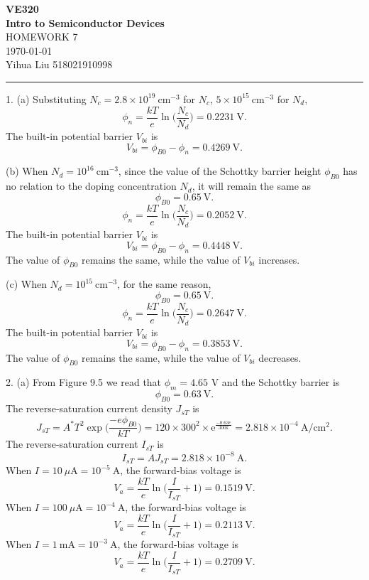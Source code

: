 \documentclass[a4paper]{article}
\begin{document}
\begin{center}
\huge
\textbf{VE320\\Intro to Semiconductor Devices\\}
\Large
\vspace{30pt}
\uppercase{Homework 7}\\
\vspace{5pt}\today\\
\vspace{5pt}
Yihua Liu 518021910998
\vspace{5pt}
\rule[-10pt]{.97\linewidth}{0.05em}
\end{center}
1. (a) Substituting $N_c=2.8\times10^{19}\ \mathrm{cm^{-3}}$ for $N_c$, $5\times10^{15}\ \mathrm{cm^{-3}}$ for $N_d$,
$$\phi_n=\frac{kT}{e}\ln{\bigg(\frac{N_c}{N_d}\bigg)}=0.2231\ \mathrm{V}.$$
The built-in potential barrier $V_{bi}$ is
$$V_{bi}=\phi_{B0}-\phi_n=0.4269\ \mathrm{V}.$$

(b) When $N_d=10^{16}\ \mathrm{cm^{-3}}$, since the value of the Schottky barrier height $\phi_{B0}$ has no relation to the doping concentration $N_d$, it will remain the same as
$$\phi_{B0}=0.65\ \mathrm{V}.$$
$$\phi_n=\frac{kT}{e}\ln{\bigg(\frac{N_c}{N_d}\bigg)}=0.2052\ \mathrm{V}.$$
The built-in potential barrier $V_{bi}$ is
$$V_{bi}=\phi_{B0}-\phi_n=0.4448\ \mathrm{V}.$$
The value of $\phi_{B0}$ remains the same, while the value of $V_{bi}$ increases.

(c) When $N_d=10^{15}\ \mathrm{cm^{-3}}$, for the same reason,
$$\phi_{B0}=0.65\ \mathrm{V}.$$
$$\phi_n=\frac{kT}{e}\ln{\bigg(\frac{N_c}{N_d}\bigg)}=0.2647\ \mathrm{V}.$$
The built-in potential barrier $V_{bi}$ is
$$V_{bi}=\phi_{B0}-\phi_n=0.3853\ \mathrm{V}.$$
The value of $\phi_{B0}$ remains the same, while the value of $V_{bi}$ decreases.

2. (a) From Figure 9.5 we read that $\phi_m=4.65$ V and the Schottky barrier is
$$\phi_{B0}=0.63\ \mathrm{V}.$$
The reverse-saturation current density $J_{sT}$ is
$$J_{sT}=A^*T^2\exp{\bigg(\frac{-e\phi_{B0}}{kT}\bigg)}=120\times300^2\times\mathrm{e}^{\frac{-0.63e}{300k}}=2.818\times10^{-4}\ \mathrm{A/cm^2}.$$
The reverse-saturation current $I_{sT}$ is
$$I_{sT}=AJ_{sT}=2.818\times10^{-8}\ \mathrm{A}.$$
When $I=10\ \mu\mathrm{A}=10^{-5}\ \mathrm{A}$, the forward-bias voltage is
$$V_a=\frac{kT}{e}\ln{\bigg(\frac{I}{I_{sT}}+1\bigg)}=0.1519\ \mathrm{V}.$$
When $I=100\ \mu\mathrm{A}=10^{-4}\ \mathrm{A}$, the forward-bias voltage is
$$V_a=\frac{kT}{e}\ln{\bigg(\frac{I}{I_{sT}}+1\bigg)}=0.2113\ \mathrm{V}.$$
When $I=1\ \mathrm{mA}=10^{-3}\ \mathrm{A}$, the forward-bias voltage is
$$V_a=\frac{kT}{e}\ln{\bigg(\frac{I}{I_{sT}}+1\bigg)}=0.2709\ \mathrm{V}.$$
\end{document}
